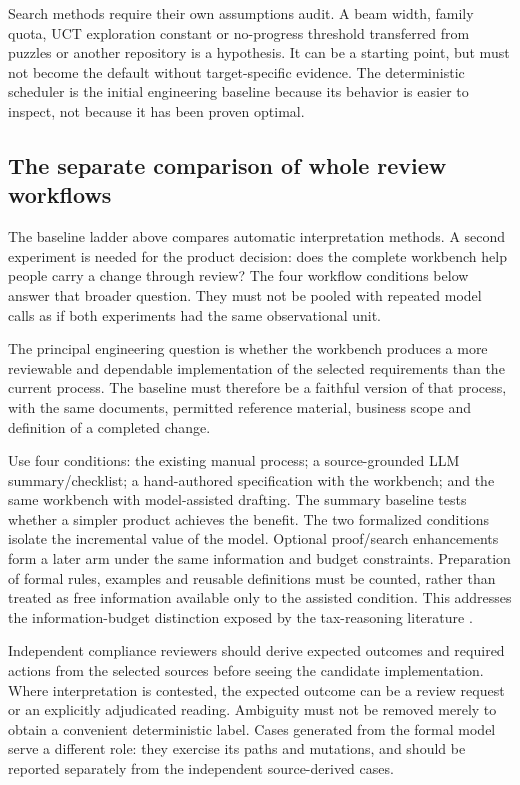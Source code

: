 \documentclass[12pt,a4paper,oneside,openany]{book}
\begin{document}
Search methods require their own assumptions audit. A beam width, family quota,
UCT exploration constant or no-progress threshold transferred from puzzles or
another repository is a hypothesis. It can be a starting point, but must not
become the default without target-specific evidence. The deterministic scheduler
is the initial engineering baseline because its behavior is easier to inspect,
not because it has been proven optimal.

\subsection{The separate comparison of whole review workflows}

The baseline ladder above compares automatic interpretation methods. A second
experiment is needed for the product decision: does the complete workbench help
people carry a change through review? The four workflow conditions below answer
that broader question. They must not be pooled with repeated model calls as if
both experiments had the same observational unit.


\label{merge:P-04-prototype:04}


The principal engineering question is whether the workbench produces a more
reviewable and dependable implementation of the selected requirements than the
current process. The baseline must therefore be a faithful version of that
process, with the same documents, permitted reference material, business scope and
definition of a completed change.

Use four conditions: the existing manual process; a source-grounded LLM
summary/checklist; a hand-authored specification with the workbench; and the same
workbench with model-assisted drafting. The summary baseline tests whether a
simpler product achieves the benefit. The two formalized conditions isolate the
incremental value of the model. Optional proof/search enhancements form a later
arm under the same information and budget constraints. Preparation of formal
rules, examples and reusable definitions must be counted, rather than treated as
free information available only to the assisted condition. This addresses the
information-budget distinction exposed by the tax-reasoning literature
\citep{jurayj2026}.

Independent compliance reviewers should derive expected outcomes and required
actions from the selected sources before seeing the candidate implementation.
Where interpretation is contested, the expected outcome can be a review request
or an explicitly adjudicated reading. Ambiguity must not be removed merely to
obtain a convenient deterministic label. Cases generated from the formal model
serve a different role: they exercise its paths and mutations, and should be
reported separately from the independent source-derived cases.
\end{document}
